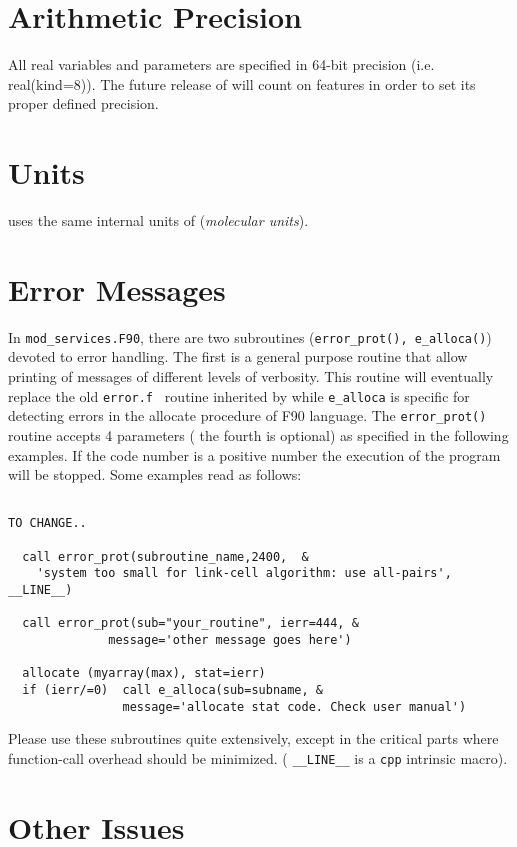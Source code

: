 \section{Arithmetic Precision}
All real variables and parameters are specified in 64-bit precision 
(i.e. real(kind=8)). 
The future release of \PR will count on \fort features in order to set its
proper defined precision. 

\section{Units}
\PR uses the same internal units of \D ({\it molecular units}). 

\section{Error Messages}

In \verb=mod_services.F90=, there are two subroutines ({\tt error\_prot(),
e\_alloca()}) devoted to error handling. The first is a general purpose
routine that allow printing of messages of different levels of
verbosity. This routine will eventually replace the old {\tt error.f } routine
inherited by \D while  {\tt e\_alloca} is specific for detecting
errors in the allocate procedure of F90 language.
The  {\tt error\_prot()} routine accepts 4 parameters ( the fourth is
optional) as specified in the following examples. If the code number is a
positive number the execution of the program will be stopped.  
Some examples read as follows:
\begin{verbatim}

TO CHANGE.. 

  call error_prot(subroutine_name,2400,  &
    'system too small for link-cell algorithm: use all-pairs', __LINE__)
 
  call error_prot(sub="your_routine", ierr=444, &
              message='other message goes here')

  allocate (myarray(max), stat=ierr)
  if (ierr/=0)  call e_alloca(sub=subname, &
                message='allocate stat code. Check user manual')

\end{verbatim}

Please use these subroutines quite extensively, except in the critical
parts where function-call overhead should be
minimized. (  \verb=__LINE__= is a  {\tt cpp}
intrinsic macro).


\section{Other Issues} 

